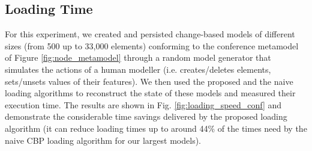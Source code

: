 \documentclass{llncs}
\begin{document}
\subsection{Loading Time}
\label{subsec:loading_time_test}

For this experiment, we created and persisted change-based models of different sizes (from 500 up to 33,000 elements) conforming to the conference metamodel of Figure \ref{fig:node_metamodel} through a random model generator that simulates the actions of a human modeller (i.e. creates/deletes elements, sets/unsets values of their features). We then used the proposed and the naive loading algorithms to reconstruct the state of these models and measured their execution time. The results are shown in Fig. \ref{fig:loading_speed_conf} and demonstrate the considerable time savings delivered by the proposed loading algorithm (it can reduce loading times up to around 44\% of the times need by the naive CBP loading algorithm for our largest models).
\end{document}
